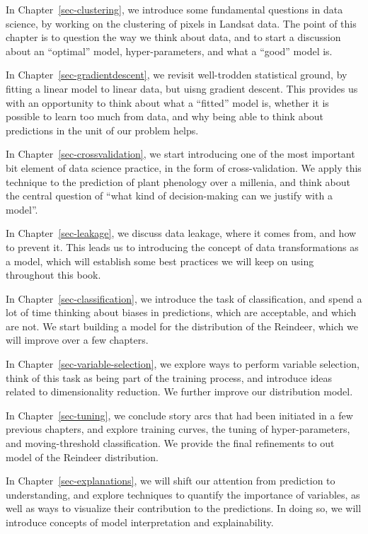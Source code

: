 \documentclass[
  letterpaper,
]{scrbook}
\begin{document}
In Chapter~\ref{sec-clustering}, we introduce some fundamental questions
in data science, by working on the clustering of pixels in Landsat data.
The point of this chapter is to question the way we think about data,
and to start a discussion about an ``optimal'' model, hyper-parameters,
and what a ``good'' model is.

In Chapter~\ref{sec-gradientdescent}, we revisit well-trodden
statistical ground, by fitting a linear model to linear data, but uisng
gradient descent. This provides us with an opportunity to think about
what a ``fitted'' model is, whether it is possible to learn too much
from data, and why being able to think about predictions in the unit of
our problem helps.

In Chapter~\ref{sec-crossvalidation}, we start introducing one of the
most important bit element of data science practice, in the form of
cross-validation. We apply this technique to the prediction of plant
phenology over a millenia, and think about the central question of
``what kind of decision-making can we justify with a model''.

In Chapter~\ref{sec-leakage}, we discuss data leakage, where it comes
from, and how to prevent it. This leads us to introducing the concept of
data transformations as a model, which will establish some best
practices we will keep on using throughout this book.

In Chapter~\ref{sec-classification}, we introduce the task of
classification, and spend a lot of time thinking about biases in
predictions, which are acceptable, and which are not. We start building
a model for the distribution of the Reindeer, which we will improve over
a few chapters.

In Chapter~\ref{sec-variable-selection}, we explore ways to perform
variable selection, think of this task as being part of the training
process, and introduce ideas related to dimensionality reduction. We
further improve our distribution model.

In Chapter~\ref{sec-tuning}, we conclude story arcs that had been
initiated in a few previous chapters, and explore training curves, the
tuning of hyper-parameters, and moving-threshold classification. We
provide the final refinements to out model of the Reindeer distribution.

In Chapter~\ref{sec-explanations}, we will shift our attention from
prediction to understanding, and explore techniques to quantify the
importance of variables, as well as ways to visualize their contribution
to the predictions. In doing so, we will introduce concepts of model
interpretation and explainability.
\end{document}
